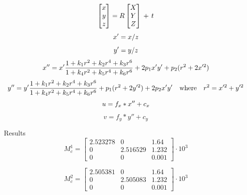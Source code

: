 \begin{equation}\label{eq:3}
\begin{bmatrix}{x}\\{y}\\{z}\end{bmatrix} = R  \begin{bmatrix}{X}\\{Y}\\{Z}\end{bmatrix}\,+\,t\\ \end{equation}
\begin{equation}x' = x/z \\ \end{equation}
\begin{equation}y' = y/z \\ \end{equation}
\begin{equation}x'' = x'  \frac{1 + k_1 r^2 + k_2 r^4 + k_3 r^6}{1 + k_4 r^2 + k_5 r^4 + k_6 r^6} + 2 p_1 x' y' + p_2(r^2 + 2 x'^2)  \\ \end{equation}
\begin{equation}y'' = y'  \frac{1 + k_1 r^2 + k_2 r^4 + k_3 r^6}{1 + k_4 r^2 + k_5 r^4 + k_6 r^6} + p_1 (r^2 + 2 y'^2) + 2 p_2 x' y'  \\
\quad \text{where} \quad r^2 = x'^2 + y'^2  \\ \end{equation}
\begin{equation}u = f_x*x'' + c_x \\ \end{equation}
\begin{equation}v = f_y*y'' + c_y \end{equation}

Results\\

\begin{equation}\label{eq::cm1}
M_c^1 = \begin{bmatrix}
2.523278 & 0 & 1.64 \\
0 & 2.516529 & 1.232 \\
0 & 0 & 0.001
\end{bmatrix}\cdot10^3
\end{equation}

\begin{equation}\label{eq::cm2}
M_c^2 = \begin{bmatrix}
2.505381 & 0 & 1.64 \\
0 & 2.505083 & 1.232 \\
0 & 0 & 0.001
\end{bmatrix}\cdot10^3
\end{equation}

